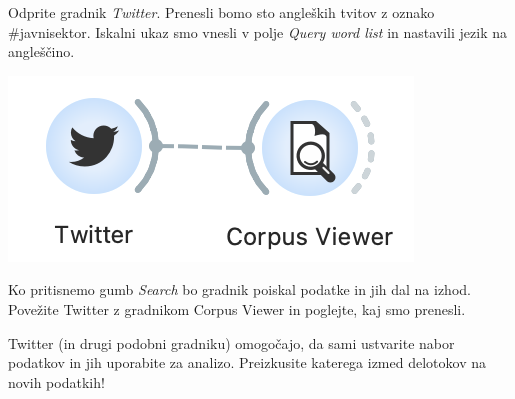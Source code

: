Odprite gradnik \textit{Twitter}. Prenesli bomo sto angleških tvitov z oznako \#javnisektor. Iskalni ukaz smo vnesli v polje \textit{Query word list} in nastavili jezik na angleščino.

\begin{marginfigure}[0cm]
    \includegraphics[width=\linewidth]{twitter-workflow.png}
    \caption{}
\end{marginfigure}

Ko pritisnemo gumb \textit{Search} bo gradnik poiskal podatke in jih dal na izhod. Povežite Twitter z gradnikom Corpus Viewer in poglejte, kaj smo prenesli.

Twitter (in drugi podobni gradniku) omogočajo, da sami ustvarite nabor podatkov in jih uporabite za analizo. Preizkusite katerega izmed delotokov na novih podatkih!